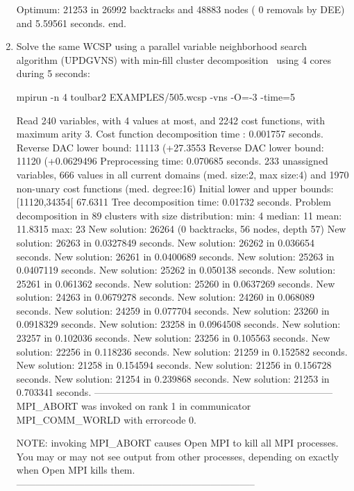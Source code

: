 \begin{enumerate}
{\begin{DoxyCode}
Optimum: 21253 in 26992 backtracks and 48883 nodes ( 0 removals by DEE) and 5.59561 seconds.
end.
\end{DoxyCode}}
\item Solve the same WCSP using a parallel variable neighborhood search algorithm (UPDGVNS) with min-fill cluster decomposition~\cite{Ouali17} using 4 cores during 5 seconds:
\begin{DoxyCode}
	mpirun -n 4 toulbar2 EXAMPLES/505.wcsp -vns -O=-3 -time=5
\end{DoxyCode}
{\scriptsize
\begin{DoxyCode}
Read 240 variables, with 4 values at most, and 2242 cost functions, with maximum arity 3.
Cost function decomposition time : 0.001757 seconds.
Reverse DAC lower bound: 11113 (+27.3553%
Reverse DAC lower bound: 11120 (+0.0629496%
Preprocessing time: 0.070685 seconds.
233 unassigned variables, 666 values in all current domains (med. size:2, max size:4) and 1970 non-unary cost functions (med. degree:16)
Initial lower and upper bounds: [11120,34354[ 67.6311%
Tree decomposition time: 0.01732 seconds.
Problem decomposition in 89 clusters with size distribution: min: 4 median: 11 mean: 11.8315 max: 23
New solution: 26264 (0 backtracks, 56 nodes, depth 57)
New solution: 26263 in 0.0327849 seconds.
New solution: 26262 in 0.036654 seconds.
New solution: 26261 in 0.0400689 seconds.
New solution: 25263 in 0.0407119 seconds.
New solution: 25262 in 0.050138 seconds.
New solution: 25261 in 0.061362 seconds.
New solution: 25260 in 0.0637269 seconds.
New solution: 24263 in 0.0679278 seconds.
New solution: 24260 in 0.068089 seconds.
New solution: 24259 in 0.077704 seconds.
New solution: 23260 in 0.0918329 seconds.
New solution: 23258 in 0.0964508 seconds.
New solution: 23257 in 0.102036 seconds.
New solution: 23256 in 0.105563 seconds.
New solution: 22256 in 0.118236 seconds.
New solution: 21259 in 0.152582 seconds.
New solution: 21258 in 0.154594 seconds.
New solution: 21256 in 0.156728 seconds.
New solution: 21254 in 0.239868 seconds.
New solution: 21253 in 0.703341 seconds.
--------------------------------------------------------------------------
MPI_ABORT was invoked on rank 1 in communicator MPI_COMM_WORLD 
with errorcode 0.

NOTE: invoking MPI_ABORT causes Open MPI to kill all MPI processes.
You may or may not see output from other processes, depending on
exactly when Open MPI kills them.
--------------------------------------------------------------------------


\end{DoxyCode}}
\end{enumerate}
